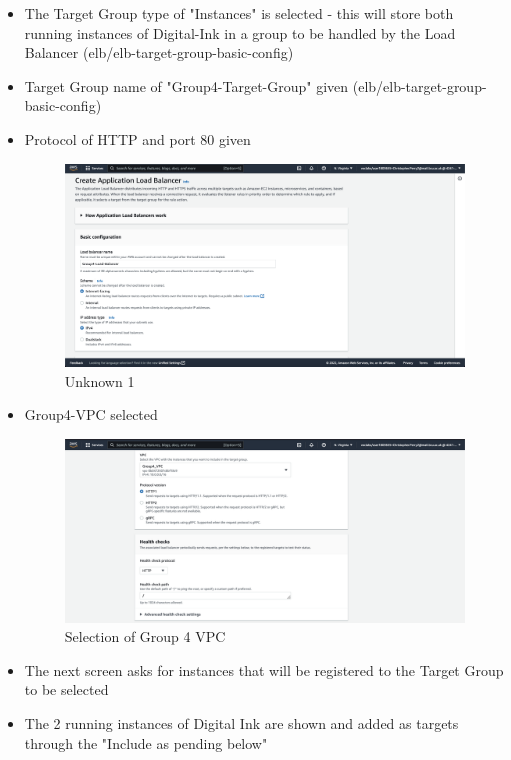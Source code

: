 \begin{itemize}
	\item The Target Group type of "Instances" is selected - this will store both running instances of Digital-Ink in a group
	      to be handled by the Load Balancer (elb/elb-target-group-basic-config)
	\item Target Group name of "Group4-Target-Group" given (elb/elb-target-group-basic-config)
	\item Protocol of HTTP and port 80 given \begin{figure}[H]
	      \centering
	      \includegraphics[width=\textwidth]{resources/elb/elb-basic-config.png}
	      \caption{Unknown 1}
	      \label{fig:elb-basic-config}
	\end{figure}
	\item Group4-VPC selected \begin{figure}[H]
	      \centering
	      \includegraphics[width=\textwidth]{resources/elb/elb-vpc.png}
	      \caption{Selection of Group 4 VPC}
	      \label{fig:elb-vpc}
	\end{figure}
	\item The next screen asks for instances that will be registered to the Target Group to be selected
	\item The 2 running instances of Digital Ink are shown and added as targets through the "Include as pending below"

\end{itemize}
